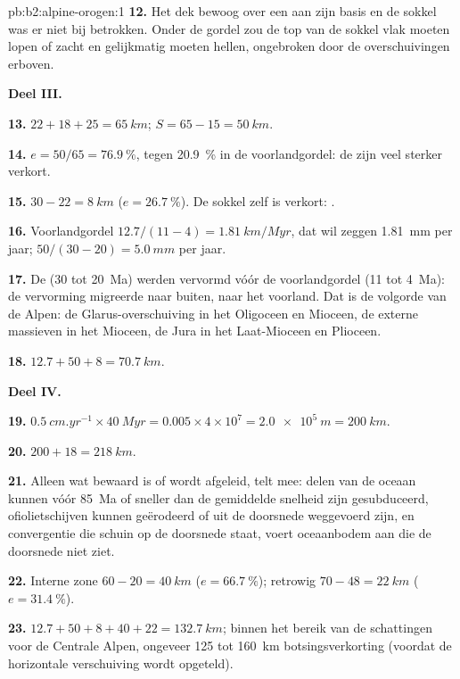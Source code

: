 \begin{solution}{pb:b2:alpine-orogen:1}
\textbf{12.} Het dek bewoog over een  aan zijn basis en de sokkel was er niet
bij betrokken. Onder de gordel zou de top van de sokkel vlak moeten lopen of zacht en
gelijkmatig moeten hellen, ongebroken door de overschuivingen erboven.

\noindent\textbf{Deel III.}

\textbf{13.} $22 + 18 + 25 = \qty{65}{km}$; $S = 65 - 15 = \qty{50}{km}$.

\textbf{14.} $e = 50/65 = \qty{76.9}{\percent}$, tegen \qty{20.9}{\percent} in de
voorlandgordel: de  zijn veel sterker verkort.

\textbf{15.} $30 - 22 = \qty{8}{km}$ ($e = \qty{26.7}{\percent}$). De sokkel zelf is
verkort: .

\textbf{16.} Voorlandgordel $12.7/(11 - 4) = \qty{1.81}{km/Myr}$, dat wil zeggen
\qty{1.81}{mm} per jaar;  $50/(30 - 20) = \qty{5.0}{mm}$ per jaar.

\textbf{17.} De  (30 tot \qty{20}{Ma}) werden vervormd vóór de voorlandgordel (11 tot
\qty{4}{Ma}): de vervorming migreerde naar buiten, naar het voorland. Dat is de volgorde van de
Alpen: de Glarus-overschuiving in het Oligoceen en Mioceen, de externe massieven in het Mioceen,
de Jura in het Laat-Mioceen en Plioceen.

\textbf{18.} $12.7 + 50 + 8 = \qty{70.7}{km}$.

\noindent\textbf{Deel IV.}

\textbf{19.} $\qty{0.5}{cm.yr^{-1}}\times\qty{40}{Myr} = 0.005\times4\times10^7 =
\qty{2.0e5}{m} = \qty{200}{km}$.

\textbf{20.} $200 + 18 = \qty{218}{km}$.

\textbf{21.} Alleen wat bewaard is of wordt afgeleid, telt mee: delen van de oceaan kunnen
vóór \qty{85}{Ma} of sneller dan de gemiddelde snelheid zijn gesubduceerd, ofiolietschijven kunnen
geërodeerd of uit de doorsnede weggevoerd zijn, en convergentie die schuin op de doorsnede staat, voert
oceaanbodem aan die de doorsnede niet ziet.

\textbf{22.} Interne zone $60 - 20 = \qty{40}{km}$ ($e = \qty{66.7}{\percent}$); retrowig
$70 - 48 = \qty{22}{km}$ ($e = \qty{31.4}{\percent}$).

\textbf{23.} $12.7 + 50 + 8 + 40 + 22 = \qty{132.7}{km}$; binnen het bereik van de schattingen
voor de Centrale Alpen, ongeveer 125 tot \qty{160}{km} botsingsverkorting (voordat de
horizontale verschuiving wordt opgeteld).


\end{solution}
